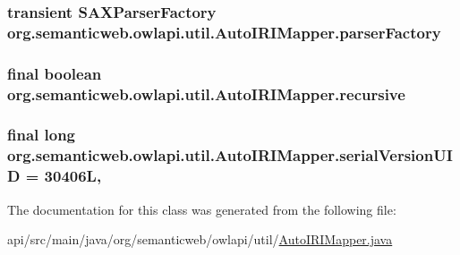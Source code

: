 \hypertarget{classorg_1_1semanticweb_1_1owlapi_1_1util_1_1_auto_i_r_i_mapper_a5ba23ae9c4421cdd609f17cc30d8813f}{
\subsubsection[{parser\-Factory}]{\setlength{\rightskip}{0pt plus 5cm}transient S\-A\-X\-Parser\-Factory org.\-semanticweb.\-owlapi.\-util.\-Auto\-I\-R\-I\-Mapper.\-parser\-Factory\hspace{0.3cm}{\ttfamily [private]}}}\label{classorg_1_1semanticweb_1_1owlapi_1_1util_1_1_auto_i_r_i_mapper_a5ba23ae9c4421cdd609f17cc30d8813f}
\hypertarget{classorg_1_1semanticweb_1_1owlapi_1_1util_1_1_auto_i_r_i_mapper_a031ceaf910799a4c2be7be3b4f5e8cbe}{
\subsubsection[{recursive}]{\setlength{\rightskip}{0pt plus 5cm}final boolean org.\-semanticweb.\-owlapi.\-util.\-Auto\-I\-R\-I\-Mapper.\-recursive\hspace{0.3cm}{\ttfamily [private]}}}\label{classorg_1_1semanticweb_1_1owlapi_1_1util_1_1_auto_i_r_i_mapper_a031ceaf910799a4c2be7be3b4f5e8cbe}
\hypertarget{classorg_1_1semanticweb_1_1owlapi_1_1util_1_1_auto_i_r_i_mapper_ac79109ebc11ab2656f549e90ce1027e3}{
\subsubsection[{serial\-Version\-U\-I\-D}]{\setlength{\rightskip}{0pt plus 5cm}final long org.\-semanticweb.\-owlapi.\-util.\-Auto\-I\-R\-I\-Mapper.\-serial\-Version\-U\-I\-D = 30406\-L\hspace{0.3cm}{\ttfamily [static]}, {\ttfamily [private]}}}\label{classorg_1_1semanticweb_1_1owlapi_1_1util_1_1_auto_i_r_i_mapper_ac79109ebc11ab2656f549e90ce1027e3}


The documentation for this class was generated from the following file\-:\begin{DoxyCompactItemize}
\item 
api/src/main/java/org/semanticweb/owlapi/util/\hyperlink{_auto_i_r_i_mapper_8java}{Auto\-I\-R\-I\-Mapper.\-java}\end{DoxyCompactItemize}
